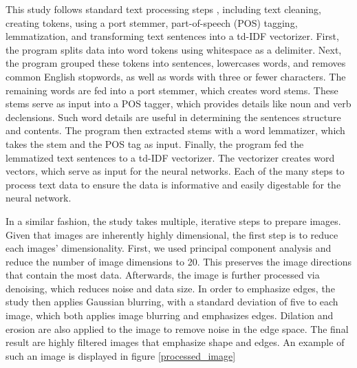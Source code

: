 \documentclass[mksc,blindrev]{informs3} %
\begin{document}
This study follows standard text processing steps \cite{Camacho-Collados2019}, including text cleaning, creating tokens, using a port stemmer, part-of-speech (POS) tagging, lemmatization, and transforming text sentences into a td-IDF vectorizer. First, the program splits data into word tokens using whitespace as a delimiter. Next, the program grouped these tokens into sentences, lowercases words, and removes common English stopwords, as well as words with three or fewer characters. The remaining words are fed into a port stemmer, which creates word stems. These stems serve as input into a POS tagger, which provides details like noun and verb declensions. Such word details are useful in determining the sentences structure and contents. The program then extracted stems with a word lemmatizer, which takes the stem and the POS tag as input. Finally, the program fed the lemmatized text sentences to a td-IDF vectorizer. The vectorizer creates word vectors, which serve as input for the neural networks. Each of the many steps to process text data to ensure the data is informative and easily digestable for the neural network.

In a similar fashion, the study takes multiple, iterative steps to prepare images. Given that images are inherently highly dimensional, the first step is to reduce each images’ dimensionality. First, we used principal component analysis and reduce the number of image dimensions to 20. This preserves the image directions that contain the most data. Afterwards, the image is further processed via denoising, which reduces noise and data size. In order to emphasize edges, the study then applies Gaussian blurring, with a standard deviation of five to each image, which both applies image blurring and emphasizes edges. Dilation and erosion are also applied to the image to remove noise in the edge space. The final result are highly filtered images that emphasize shape and edges. An example of such an image is displayed in figure \ref{processed_image}
\end{document}
